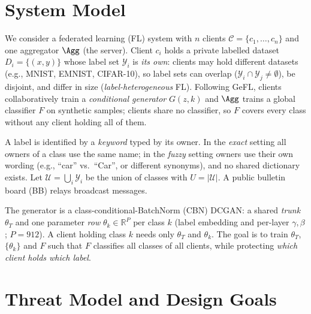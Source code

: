 
\section{System Model}
\label{sec:system}

We consider a federated learning (FL) system with $n$ clients $\mathcal{C}=\{c_1,\dots,c_n\}$ and one
aggregator $\Agg$ (the server). Client $c_i$ holds a private labelled dataset
$D_i=\{(x,y)\}$ whose label set $\mathcal{Y}_i$ is \emph{its own}: clients may hold different datasets
(e.g., MNIST, EMNIST, CIFAR-10), so label sets can overlap ($\mathcal{Y}_i\cap\mathcal{Y}_j\neq\emptyset$),
be disjoint, and differ in size (\emph{label-heterogeneous} FL). Following GeFL, clients
collaboratively train a \emph{conditional generator} $G(z,k)$ and $\Agg$ trains a global classifier
$F$ on synthetic samples; clients share no classifier, so $F$ covers every class without any client
holding all of them.

A label is identified by a \emph{keyword} typed by its owner. In the \emph{exact} setting all owners of
a class use the same name; in the \emph{fuzzy} setting owners use their own wording
(e.g., ``car'' vs.\ ``Car'', or different synonyms), and no shared dictionary exists.
Let $\mathcal{U}=\bigcup_i \mathcal{Y}_i$ be the union of classes with $U=|\mathcal{U}|$.
A public bulletin board (BB) relays broadcast messages.

The generator is a class-conditional-BatchNorm (CBN) DCGAN: a shared \emph{trunk} $\theta_T$ and one
parameter \emph{row} $\theta_k\in\mathbb{R}^{P}$ per class $k$ (label embedding and per-layer
$\gamma,\beta$; $P=912$). A client holding class $k$ needs only $\theta_T$ and $\theta_k$.
The goal is to train $\theta_T$, $\{\theta_k\}$ and $F$ such that $F$ classifies all
classes of all clients, while protecting \emph{which client holds which label}.

\section{Threat Model and Design Goals}
\label{sec:threat}

